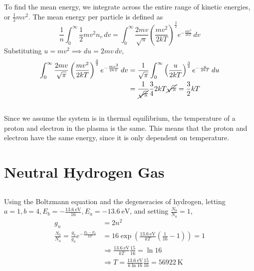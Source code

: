 \documentclass{article}
\begin{document}
To find the mean energy, we integrate across the entire range of kinetic energies, or \(\frac{1}{2} m v^2\).
The mean energy per particle is defined as
\begin{equation}
    \frac{1}{n} \int_0^\infty \frac{1}{2} m v^2 n_v \, dv = \int_0^\infty \frac{2 m v}{\sqrt{\pi}} \left(\frac{m v^2}{2 kT}\right)^{\frac{3}{2}} e^{-\frac{m v^2}{2 kT}} \, dv
\end{equation}
Substituting \(u = m v^2 \implies du = 2 m v \, dv\),
\begin{align}
    \int_0^\infty \frac{2 m v}{\sqrt{\pi}} \left(\frac{m v^2}{2 kT}\right)^{\frac{3}{2}} e^{-\frac{m v^2}{2 kT}} \, dv &= \frac{1}{\sqrt{\pi}} \int_0^\infty \left(\frac{u}{2 kT}\right)^{\frac{3}{2}} e^{-\frac{u}{2 kT}} \, du \\
    &= \frac{1}{\cancel{\sqrt{\pi}}} \frac{3}{4} 2 kT \cancel{\sqrt{\pi}} = \frac{3}{2} kT
\end{align}

\subsection{}

Since we assume the system is in thermal equilibrium, the temperature of a proton and electron in the plasma is the same.
This means that the proton and electron have the same energy, since it is only dependent on temperature.

\section{Neutral Hydrogen Gas}

\subsection{}

Using the Boltzmann equation and the degeneracies of hydrogen, letting \(a = 1, b = 4, E_b = -\frac{\SI{13.6}{\electronvolt}}{16}, E_a = \SI{-13.6}{\electronvolt}\), and setting \(\frac{N_b}{N_a} = 1\),
\begin{align}
    g_n &= 2n^2 \\
    \frac{N_b}{N_a} = \frac{g_b}{g_a} e^{-\frac{E_b - E_a}{kT}} &= 16 \exp\left(\frac{\SI{13.6}{\electronvolt}}{kT} \left(\frac{1}{16} - 1\right)\right) = 1 \\
    &\Rightarrow \frac{\SI{13.6}{\electronvolt}}{kT} \frac{15}{16} = \ln{16} \\
    &\Rightarrow T = \frac{\SI{13.6}{\electronvolt}}{k \ln{16}} \frac{15}{16} = \SI{56922}{\kelvin}
\end{align}
\end{document}
